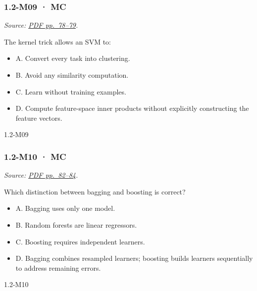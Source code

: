 \noindent\begin{minipage}{\linewidth}

\subsubsection{1.2-M09 · MC}\label{m09-mc-1}

\emph{Source:
\href{../Lecture\%20Slides/1.2.\%20Shallow\%20Learning.pdf\#page=78}{PDF
pp.~78--79}.}

The kernel trick allows an SVM to:

\begin{itemize}
\tightlist
\item
  A. Convert every task into clustering.
\item
  B. Avoid any similarity computation.
\item
  C. Learn without training examples.
\item
  D. Compute feature-space inner products without explicitly
  constructing the feature vectors.
\end{itemize}

\begin{solution}[8mm]{1.2-M09}

\end{solution}
\end{minipage}\par\medskip

\noindent\begin{minipage}{\linewidth}

\subsubsection{1.2-M10 · MC}\label{m10-mc-1}

\emph{Source:
\href{../Lecture\%20Slides/1.2.\%20Shallow\%20Learning.pdf\#page=82}{PDF
pp.~82--84}.}

Which distinction between bagging and boosting is correct?

\begin{itemize}
\tightlist
\item
  A. Bagging uses only one model.
\item
  B. Random forests are linear regressors.
\item
  C. Boosting requires independent learners.
\item
  D. Bagging combines resampled learners; boosting builds learners
  sequentially to address remaining errors.
\end{itemize}

\begin{solution}[8mm]{1.2-M10}

\end{solution}
\end{minipage}\par\medskip

